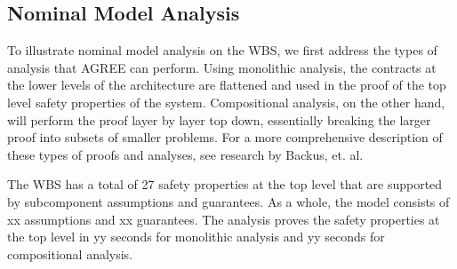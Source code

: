 


\subsection{Nominal Model Analysis}
To illustrate nominal model analysis on the WBS, we first address the types of analysis that AGREE can perform. Using monolithic analysis, the contracts at the lower levels of the architecture are flattened and used in the proof of the top level safety properties of the system. Compositional analysis, on the other hand, will perform the proof layer by layer top down, essentially breaking the larger proof into subsets of smaller problems. For a more comprehensive description of these types of proofs and analyses, see research by Backus, et. al. \cite{cofer2012compositional,QFCS15:backes} 

The WBS has a total of 27 safety properties at the top level that are supported by subcomponent assumptions and guarantees.  As a whole, the model consists of xx assumptions and xx guarantees. The analysis proves the safety properties at the top level in yy seconds for monolithic analysis and yy seconds for compositional analysis.  

